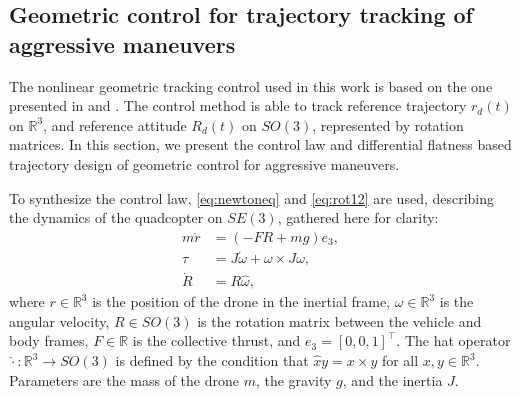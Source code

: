 \subsection{Geometric control for trajectory tracking of aggressive maneuvers}
The nonlinear geometric tracking control used in this work is based on the one presented in \cite{lelemc2010} and \cite{turpinkumar2011}. The control method is able to track reference trajectory $r_d(t)$ on $\mathbb{R}^3$, and reference attitude $R_d(t)$ on $SO(3)$, represented by rotation matrices. In this section, we present the control law and differential flatness based trajectory design of geometric control for aggressive maneuvers.

To synthesize the control law, \eqref{eq:newtoneq} and \eqref{eq:rot12} are used, describing the dynamics of the quadcopter on $SE(3)$, gathered here for clarity:
\begin{subequations}
\begin{align}
    m\ddot{r}& = (-FR + mg)e_3,\label{eq:geom_tran}\\
    \tau& = J\dot\omega + \omega\times J \omega,\\
    \dot R &= R\hat{\omega},
\end{align}
\end{subequations}
where $r\in\mathbb{R}^3$ is the position of the drone in the inertial frame, $\omega\in\mathbb{R}^3$ is the angular velocity, $R\in SO(3)$ is the rotation matrix between the vehicle and body frames, $F\in\mathbb{R}$ is the collective thrust, and $e_3=[ 0, 0, 1 ]^\top$. The hat operator $\hat{\cdot}:\mathbb{R}^3\rightarrow SO(3)$ is defined by the condition that $\hat{x}y = x\times y$ for all $x,y\in \mathbb{R}^3$. Parameters are the mass of the drone $m$, the gravity $g$, and the inertia $J$.

